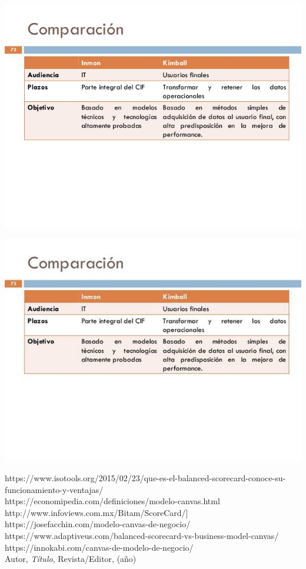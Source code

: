 \begin{center}
\includegraphics[width=15cm]{./Imagenes/image017}
\end{center}
\begin{center}
\includegraphics[width=15cm]{./Imagenes/image018}
\end{center}

\newpage
\begin{thebibliography}{99}
https://www.isotools.org/2015/02/23/que-es-el-balanced-scorecard-conoce-su-funcionamiento-y-ventajas/\\
https://economipedia.com/definiciones/modelo-canvas.html\\
http://www.infoviews.com.mx/Bitam/ScoreCard/]\\
https://josefacchin.com/modelo-canvas-de-negocio/\\
https://www.adaptiveus.com/balanced-scorecard-vs-business-model-canvas/\\
https://innokabi.com/canvas-de-modelo-de-negocio/\\


 Autor, \emph{Título}, Revista/Editor, (año)

\end{thebibliography}



